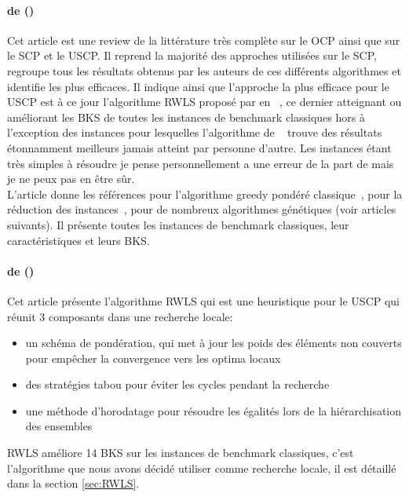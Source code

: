 \documentclass[a4paper,11pt,twoside,french,report]{../common/simplem}
\begin{document}
				\paragraph*{ de \citeauthor{Kritter2019} (\citeyear{Kritter2019})~\cite{Kritter2019}\\}
					Cet article est une review de la littérature très complète sur le \gls{OCP} ainsi que sur le \gls{SCP} et le \gls{USCP}. Il reprend la majorité des approches utilisées sur le \gls{SCP}, regroupe tous les résultats obtenus par les auteurs de ces différents algorithmes et identifie les plus efficaces. Il indique ainsi que l'approche la plus efficace pour le \gls{USCP} est à ce jour l'algorithme \gls{RWLS} proposé par \citeauthor{Gao2015} en \citeyear{Gao2015}~\cite{Gao2015}, ce dernier atteignant ou améliorant les \gls{BKS} de toutes les instances de benchmark classiques hors  à l'exception des instances  pour lesquelles l'algorithme de \citeauthor{Akhter2015}~\cite{Akhter2015} trouve des résultats étonnamment meilleurs jamais atteint par personne d'autre. Les instances  étant très simples à résoudre je pense personnellement a une erreur de la part de \citeauthor{Akhter2015} mais je ne peux pas en être sûr.\\
					L'article donne les références pour l'algorithme greedy pondéré classique~\cite{Chvatal1979}, pour la réduction des instances~\cite{Beasley1987}, pour de nombreux algorithmes génétiques (voir articles suivants). Il présente toutes les instances de benchmark classiques, leur caractéristiques et leurs \gls{BKS}.
				\paragraph*{ de \citeauthor{Gao2015} (\citeyear{Gao2015})~\cite{Gao2015}\\}
					Cet article présente l'algorithme \acrfull{RWLS} qui est une heuristique pour le \gls{USCP} qui réunit 3 composants dans une recherche locale:
					\begin{itemize}
						\item un schéma de pondération, qui met à jour les poids des éléments non couverts pour empêcher la convergence vers les optima locaux
						\item des stratégies tabou pour éviter les cycles pendant la recherche
						\item une méthode d'horodatage pour résoudre les égalités lors de la hiérarchisation des ensembles
					\end{itemize}
					\gls{RWLS} améliore 14 \gls{BKS} sur les instances de benchmark classiques, c'est l'algorithme que nous avons décidé utiliser comme recherche locale, il est détaillé dans la section \ref{sec:RWLS}.
\end{document}
